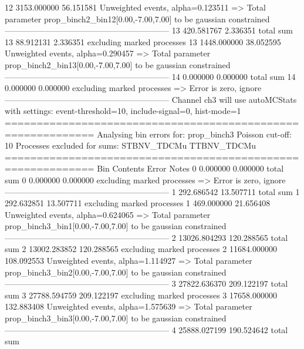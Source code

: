 12         3153.000000     56.151581       Unweighted events, alpha=0.123511
  => Total parameter prop_binch2_bin12[0.00,-7.00,7.00] to be gaussian constrained
------------------------------------------------------------
13         420.581767      2.336351        total sum                     
13         88.912131       2.336351        excluding marked processes    
13         1448.000000     38.052595       Unweighted events, alpha=0.290457
  => Total parameter prop_binch2_bin13[0.00,-7.00,7.00] to be gaussian constrained
------------------------------------------------------------
14         0.000000        0.000000        total sum                     
14         0.000000        0.000000        excluding marked processes    
  => Error is zero, ignore      
------------------------------------------------------------
Channel ch3 will use autoMCStats with settings: event-threshold=10, include-signal=0, hist-mode=1
============================================================
Analysing bin errors for: prop_binch3
Poisson cut-off: 10
Processes excluded for sums: STBNV_TDCMu TTBNV_TDCMu
============================================================
Bin        Contents        Error           Notes                         
0          0.000000        0.000000        total sum                     
0          0.000000        0.000000        excluding marked processes    
  => Error is zero, ignore      
------------------------------------------------------------
1          292.686542      13.507711       total sum                     
1          292.632851      13.507711       excluding marked processes    
1          469.000000      21.656408       Unweighted events, alpha=0.624065
  => Total parameter prop_binch3_bin1[0.00,-7.00,7.00] to be gaussian constrained
------------------------------------------------------------
2          13026.804293    120.288565      total sum                     
2          13002.283852    120.288565      excluding marked processes    
2          11684.000000    108.092553      Unweighted events, alpha=1.114927
  => Total parameter prop_binch3_bin2[0.00,-7.00,7.00] to be gaussian constrained
------------------------------------------------------------
3          27822.636370    209.122197      total sum                     
3          27788.594759    209.122197      excluding marked processes    
3          17658.000000    132.883408      Unweighted events, alpha=1.575639
  => Total parameter prop_binch3_bin3[0.00,-7.00,7.00] to be gaussian constrained
------------------------------------------------------------
4          25888.027199    190.524642      total sum                     
